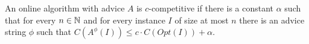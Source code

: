 \begin{definition}\label{def:advice-competitive}
    An online algorithm with advice $A$ is $c$-competitive if there is a
    constant $\alpha$ such that for every $n \in \mathbb{N}$ and for every
    instance $I$ of size at most $n$ there is an advice string $\phi$ such
    that $C(A^\phi(I)) \leq c \cdot C(Opt(I)) + \alpha$.
\end{definition}
